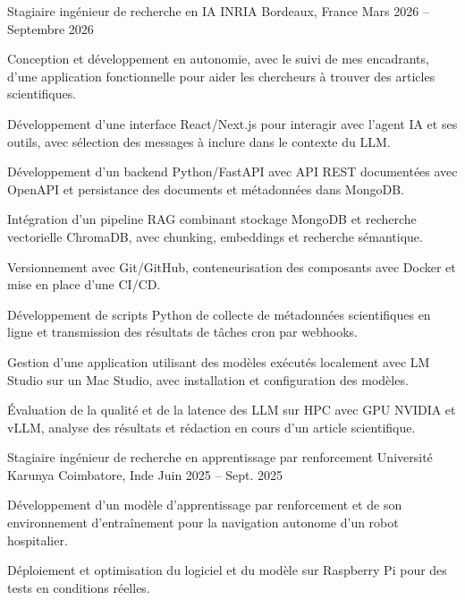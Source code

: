 
\begin{cventries}
  \cventry
    {Stagiaire ingénieur de recherche en IA}
    {INRIA}
    {Bordeaux, France}
    {Mars 2026 -- Septembre 2026}
    {
      \begin{cvitems}
        \item {Conception et développement en autonomie, avec le suivi de mes encadrants, d’une application fonctionnelle pour aider les chercheurs à trouver des articles scientifiques.}
        \item {Développement d’une interface React/Next.js pour interagir avec l’agent IA et ses outils, avec sélection des messages à inclure dans le contexte du LLM.}
        \item {Développement d’un backend Python/FastAPI avec API REST documentées avec OpenAPI et persistance des documents et métadonnées dans MongoDB.}
        \item {Intégration d’un pipeline RAG combinant stockage MongoDB et recherche vectorielle ChromaDB, avec chunking, embeddings et recherche sémantique.}
        \item {Versionnement avec Git/GitHub, conteneurisation des composants avec Docker et mise en place d’une CI/CD.}
        \item {Développement de scripts Python de collecte de métadonnées scientifiques en ligne et transmission des résultats de tâches cron par webhooks.}
        \item {Gestion d’une application utilisant des modèles exécutés localement avec LM Studio sur un Mac Studio, avec installation et configuration des modèles.}
        \item {Évaluation de la qualité et de la latence des LLM sur HPC avec GPU NVIDIA et vLLM, analyse des résultats et rédaction en cours d’un article scientifique.}
      \end{cvitems}
    }

  \cventry
    {Stagiaire ingénieur de recherche en apprentissage par renforcement}
    {Université Karunya}
    {Coimbatore, Inde}
    {Juin 2025 -- Sept. 2025}
    {
      \begin{cvitems}
        \item {Développement d’un modèle d’apprentissage par renforcement et de son environnement d’entraînement pour la navigation autonome d’un robot hospitalier.}
        \item {Déploiement et optimisation du logiciel et du modèle sur Raspberry Pi pour des tests en conditions réelles.}
      \end{cvitems}
    }
\end{cventries}
